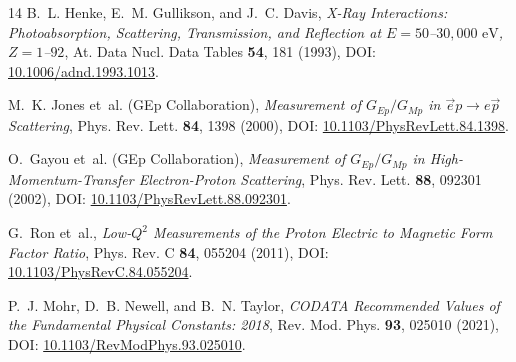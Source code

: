 \documentclass[11pt,a4paper]{article}
\begin{document}
\begin{thebibliography}{14}
		B.~L. Henke, E.~M. Gullikson, and J.~C. Davis, \emph{X-Ray Interactions: Photoabsorption, Scattering, Transmission, and Reflection at $E = 50$--$30,000\text{ eV}$, $Z = 1$--$92$}, At. Data Nucl. Data Tables \textbf{54}, 181 (1993), DOI: \href{https://doi.org/10.1006/adnd.1993.1013}{10.1006/adnd.1993.1013}.
		
		M.~K. Jones et~al. (GEp Collaboration), \emph{Measurement of $G_{Ep}/G_{Mp}$ in $\vec{e}p \to e\vec{p}$ Scattering}, Phys. Rev. Lett. \textbf{84}, 1398 (2000), DOI: \href{https://doi.org/10.1103/PhysRevLett.84.1398}{10.1103/PhysRevLett.84.1398}.
		
		O.~Gayou et~al. (GEp Collaboration), \emph{Measurement of $G_{Ep}/G_{Mp}$ in High-Momentum-Transfer Electron-Proton Scattering}, Phys. Rev. Lett. \textbf{88}, 092301 (2002), DOI: \href{https://doi.org/10.1103/PhysRevLett.88.092301}{10.1103/PhysRevLett.88.092301}.
		
		G.~Ron et~al., \emph{Low-$Q^2$ Measurements of the Proton Electric to Magnetic Form Factor Ratio}, Phys. Rev. C \textbf{84}, 055204 (2011), DOI: \href{https://doi.org/10.1103/PhysRevC.84.055204}{10.1103/PhysRevC.84.055204}.
		
		P.~J. Mohr, D.~B. Newell, and B.~N. Taylor, \emph{CODATA Recommended Values of the Fundamental Physical Constants: 2018}, Rev. Mod. Phys. \textbf{93}, 025010 (2021), DOI: \href{https://doi.org/10.1103/RevModPhys.93.025010}{10.1103/RevModPhys.93.025010}.
		
	\end{thebibliography}
	
\end{document}
